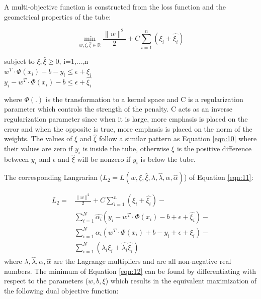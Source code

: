 \documentclass{mpaper}
\begin{document}
A multi-objective function is constructed from the loss function and the geometrical properties of the tube:

\begin{equation}\label{eqn:11}
    \min_{w, \xi, \hat{\xi} \in \mathbb{R}}{\frac{\parallel{w}\parallel^2}{2} + C\sum_{i=1}^n (\xi_i + \hat{\xi_i})}
\end{equation}
\begin{center}
subject to $\xi, \hat{\xi} \geq 0$, i=1,...,n \\ 
$w^T \cdot \Phi(x_i) + b - y_i \leq \epsilon + \xi_i$\\ 
$y_i - w^T \cdot \Phi(x_i) - b \leq  \epsilon + \hat{\xi_i} $ \\
\end{center}
where $\Phi(.)$ is the transformation to a kernel space and C is a regularization parameter which controls the strength of the penalty. C acts as an inverse regularization parameter since when it is large, more emphasis is placed on the error and when the opposite is true, more emphasis is placed on the norm of the weights. The values of $\xi$ and $\hat{\xi}$ follow a similar pattern as Equation \ref{eqn:10} where their values are zero if $y_i$ is inside the tube, otherwise $\xi$ is the positive difference between $y_i$ and $\epsilon$ and $\hat{\xi}$ will be nonzero if $y_i$ is below the tube. 

The corresponding Langrarian ($L_2=L(w,\xi,\hat{\xi},\lambda,\hat{\lambda},\alpha,\hat{\alpha})$) of Equation \ref{eqn:11}:

\begin{equation}\label{eqn:12}
\begin{aligned}
        L_2 = &  {\frac{\parallel{w}\parallel^2}{2} + C\sum_{i=1}^n (\xi_i + \hat{\xi_i})} - \\
        & {\sum_{i=1}^N\hat{\alpha_i}(y_i- w^T \cdot \Phi(x_i) -b + \epsilon + \hat{\xi_i})} - \\
        & {\sum_{i=1}^N\alpha_i(w^T \cdot \Phi(x_i) + b - y_i + \epsilon + \xi_i)} - \\
        & \sum_{i=1}^N(\lambda_i\xi_i+ \hat{\lambda_i}\hat{\xi_i})
\end{aligned}
\end{equation}
where $\lambda,\hat{\lambda},\alpha,\hat{\alpha}$ are the Lagrange multipliers and are all non-negative real numbers. The minimum of Equation \ref{eqn:12} can be found by differentiating with respect to the parameters ($w, b, \xi$) which results in the equivalent maximization of the following dual objective function:
\end{document}
